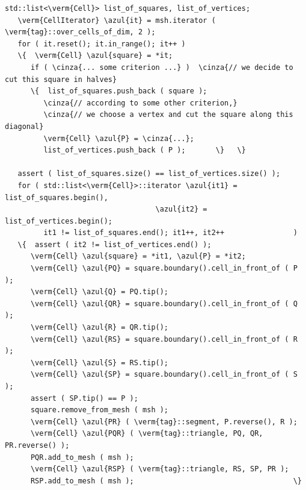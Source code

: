 \begin{Verbatim}[commandchars=\\\{\},formatcom=\small\tt,frame=single,
   label=parag-\ref{\numb section 10.\numb parag 3}.cpp,rulecolor=\color{coment},
   baselinestretch=0.94,framesep=2mm]
   std::list<\verm{Cell}> list_of_squares, list_of_vertices;
   \verm{CellIterator} \azul{it} = msh.iterator ( \verm{tag}::over_cells_of_dim, 2 );
   for ( it.reset(); it.in_range(); it++ )
   \{  \verm{Cell} \azul{square} = *it;
      if ( \cinza{... some criterion ...} )  \cinza{// we decide to cut this square in halves}
      \{  list_of_squares.push_back ( square );
         \cinza{// according to some other criterion,}
         \cinza{// we choose a vertex and cut the square along this diagonal}
         \verm{Cell} \azul{P} = \cinza{...};  
         list_of_vertices.push_back ( P );       \}   \}

   assert ( list_of_squares.size() == list_of_vertices.size() );
   for ( std::list<\verm{Cell}>::iterator \azul{it1} = list_of_squares.begin(),
                                   \azul{it2} = list_of_vertices.begin();
         it1 != list_of_squares.end(); it1++, it2++                )
   \{  assert ( it2 != list_of_vertices.end() );
      \verm{Cell} \azul{square} = *it1, \azul{P} = *it2;
      \verm{Cell} \azul{PQ} = square.boundary().cell_in_front_of ( P );
      \verm{Cell} \azul{Q} = PQ.tip();
      \verm{Cell} \azul{QR} = square.boundary().cell_in_front_of ( Q );
      \verm{Cell} \azul{R} = QR.tip();
      \verm{Cell} \azul{RS} = square.boundary().cell_in_front_of ( R );
      \verm{Cell} \azul{S} = RS.tip();
      \verm{Cell} \azul{SP} = square.boundary().cell_in_front_of ( S );
      assert ( SP.tip() == P );
      square.remove_from_mesh ( msh );
      \verm{Cell} \azul{PR} ( \verm{tag}::segment, P.reverse(), R );
      \verm{Cell} \azul{PQR} ( \verm{tag}::triangle, PQ, QR, PR.reverse() );
      PQR.add_to_mesh ( msh );
      \verm{Cell} \azul{RSP} ( \verm{tag}::triangle, RS, SP, PR );
      RSP.add_to_mesh ( msh );                                     \}
\end{Verbatim}
